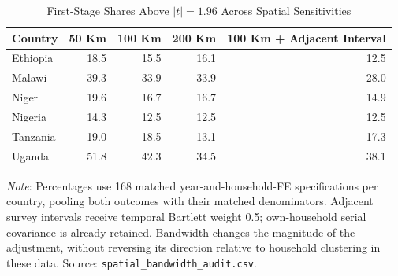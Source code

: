 \begin{table}[!htbp]
	\centering
	\caption{First-Stage Shares Above $|t|=1.96$ Across Spatial Sensitivities}
	\label{app:space_bandwidth}
	\begin{tabular}{lrrrr}
		\hline
		Country & 50 Km & 100 Km & 200 Km & 100 Km + Adjacent Interval \\
		\hline
		Ethiopia & 18.5 & 15.5 & 16.1 & 12.5 \\
		Malawi & 39.3 & 33.9 & 33.9 & 28.0 \\
		Niger & 19.6 & 16.7 & 16.7 & 14.9 \\
		Nigeria & 14.3 & 12.5 & 12.5 & 12.5 \\
		Tanzania & 19.0 & 18.5 & 13.1 & 17.3 \\
		Uganda & 51.8 & 42.3 & 34.5 & 38.1 \\
		\hline
	\end{tabular}
	\par\smallskip
	\begin{minipage}{.95\linewidth}
		\footnotesize \textit{Note}: Percentages use 168 matched year-and-household-FE
		specifications per country, pooling both outcomes with their matched
		denominators. Adjacent survey intervals receive temporal Bartlett weight
		0.5; own-household serial covariance is already retained. Bandwidth changes
		the magnitude of the adjustment, without reversing its direction relative
		to household clustering in these data. Source:
		\texttt{spatial\_bandwidth\_audit.csv}.
	\end{minipage}
\end{table}
